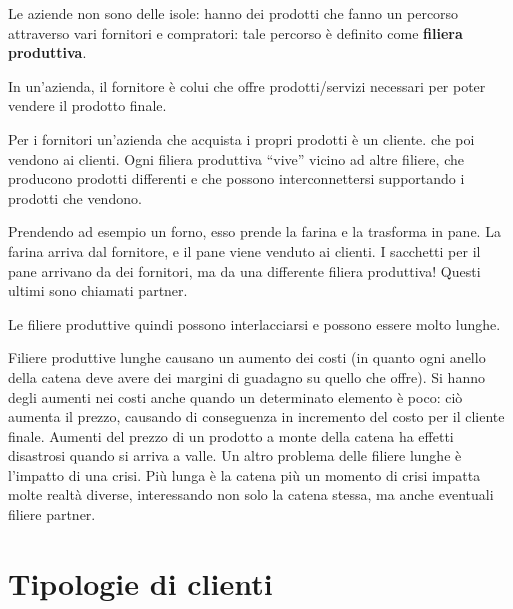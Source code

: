 
Le aziende non sono delle isole: hanno dei prodotti che fanno un percorso
attraverso vari fornitori e compratori: tale percorso è definito come
\textbf{filiera produttiva}.

\begin{definition}[Fornitore]
In un'azienda, il fornitore è colui che offre prodotti/servizi necessari per 
poter vendere il prodotto finale. 
\end{definition}

\noindent Per i fornitori un'azienda che acquista i propri prodotti è un 
cliente.  che poi vendono ai 
clienti. Ogni filiera produttiva ``vive'' vicino ad altre filiere, che producono 
prodotti differenti e che possono interconnettersi supportando i prodotti che 
vendono.

\begin{example}[Forno]
Prendendo ad esempio un forno, esso prende la farina e la trasforma in pane. La
farina arriva dal fornitore, e il pane viene venduto ai clienti. I sacchetti
per il pane arrivano da dei fornitori, ma da una differente filiera produttiva!
Questi ultimi sono chiamati partner.
\end{example}

\noindent Le filiere produttive quindi possono interlacciarsi e possono essere 
molto lunghe.

Filiere produttive lunghe causano un aumento dei costi (in quanto ogni anello
della catena deve avere dei margini di guadagno su quello che offre). Si hanno
degli aumenti nei costi anche quando un determinato elemento è poco: ciò
aumenta il prezzo, causando di conseguenza in incremento del costo per il
cliente finale. Aumenti del prezzo di un prodotto a monte della catena ha
effetti disastrosi quando si arriva a valle. Un altro problema delle filiere
lunghe è l'impatto di una crisi. Più lunga è la catena più un momento di crisi
impatta molte realtà diverse, interessando non solo la catena stessa, ma anche
eventuali filiere partner.

\section{Tipologie di clienti}

